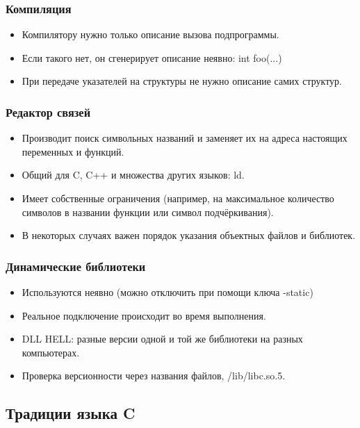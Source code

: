 \documentclass[hyperref={unicode=true}]{beamer}
\begin{document}
\begin{frame}
\frametitle{Компиляция}
\begin{itemize}
\item Компилятору нужно только описание вызова подпрограммы. 
\item Если такого нет, он сгенерирует описание неявно: int foo(...)
\item При передаче указателей на структуры не нужно описание самих
  структур. 
\end{itemize}
\end{frame}

\begin{frame}
\frametitle{Редактор связей}
\begin{itemize}
\item Производит поиск символьных названий и заменяет их на адреса
  настоящих переменных и функций. 
\item Общий для C, C++ и множества других языков: ld. 
\item Имеет собственные ограничения (например, на максимальное
  количество символов в названии функции или символ подчёркивания). 
\item В некоторых случаях важен порядок указания объектных файлов и
  библиотек. 
\end{itemize}
\end{frame}

\begin{frame}
\frametitle{Динамические библиотеки}
\begin{itemize}
\item Используются неявно (можно отключить при помощи ключа -static)
\item Реальное подключение происходит во время выполнения.
\item DLL HELL: разные версии одной и той же библиотеки на
  разных компьютерах.
\item Проверка версионности через названия файлов, /lib/libc.so.5.
\end{itemize}
\end{frame}


\subsection{Традиции языка C}
\end{document}
